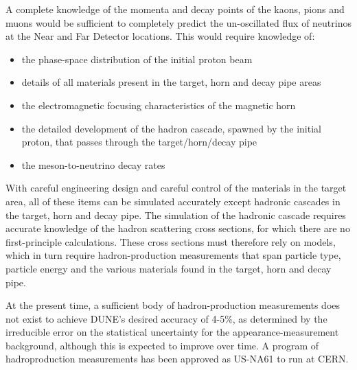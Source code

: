 A complete knowledge of the momenta and decay points of the kaons, pions and
muons would be sufficient to completely predict the un-oscillated flux of neutrinos
at the Near and Far Detector locations. This would require knowledge of:

\begin{itemize}
\item the phase-space distribution of the initial proton beam
\item details of all materials present in the target, horn and decay pipe areas
\item  the electromagnetic focusing characteristics of the magnetic horn
\item the detailed development of the hadron cascade, spawned by the
initial proton, that passes through the target/horn/decay pipe
\item the meson-to-neutrino decay rates
\end{itemize}

With careful engineering design and careful control of the materials in the target
area, all of these items can be simulated accurately except hadronic cascades in
the target, horn and decay pipe. The simulation of the hadronic cascade requires
accurate knowledge of the hadron scattering cross sections, for which there are no
first-principle calculations. These cross sections must therefore rely on models, which
in turn require hadron-production measurements that span particle type, particle
energy and the various materials found in the target, horn and decay pipe.

At the present time, a sufficient body of hadron-production
measurements does not exist to achieve DUNE's desired accuracy of
4-5\%, as determined by the irreducible error on the statistical
uncertainty for the appearance-measurement background, although this
is expected to improve over time. A program of hadroproduction
measurements has been approved as US-NA61 to run at CERN.


